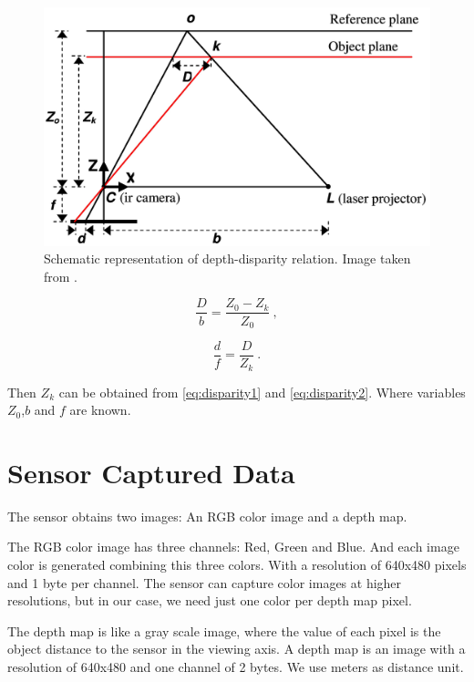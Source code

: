 \begin{figure}[h!]
\begin{center}
\includegraphics[scale=1.65]{images/kinect_triangulation}
\caption{Schematic representation of depth-disparity relation. Image taken from \cite{khoshelham2011accuracy}.}
\label{fig:disparity}
\end{center}
\end{figure}

\begin{equation}
\label{eq:disparity1}
 \frac{D}{b} = \frac{Z_0 - Z_k}{Z_0}\ ,
\end{equation}


\begin{equation}
\label{eq:disparity2}
 \frac{d}{f} = \frac{D}{Z_k}\ . 
\end{equation}

Then $Z_k$ can be obtained from \ref{eq:disparity1} and \ref{eq:disparity2}. Where variables $Z_0$,$b$ and $f$ are known.

\section{Sensor Captured Data}
\label{sec:sensor_data}

The sensor obtains two images: An RGB color image and a depth map. 

The RGB color image has three channels: Red, Green and Blue. And each image color is generated 
combining this three colors. With a resolution of 640x480 pixels and 1 byte per channel. The sensor can 
capture color images at higher resolutions, but in our case, we need just one color per depth map pixel.

The depth map is like a gray scale image, where the value of each pixel is the object distance to the sensor in the viewing axis. 
A depth map is an image with a resolution of 640x480 and one channel of 2 bytes. We use meters as distance unit.

